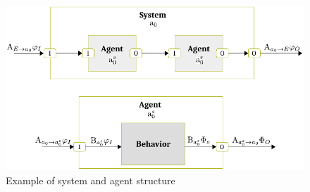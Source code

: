 \documentclass[conference]{IEEEtran}
\begin{document}
\begin{figure}[t]
	\centering
	\includegraphics[width=.9\columnwidth]{system-agent.pdf}
	\caption{Example of system and agent structure}
	\label{fig:system-agent}
\end{figure}
\end{document}
